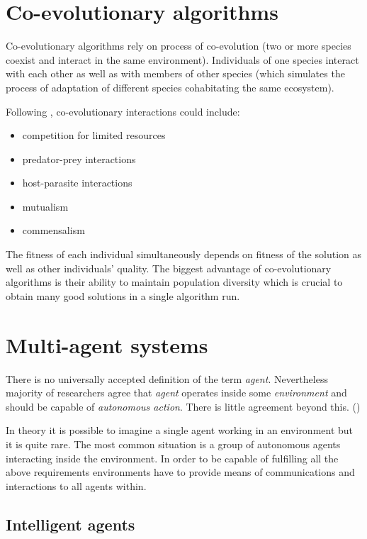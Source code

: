 \begin{}
\section{Co-evolutionary algorithms}
\label{sec:co-evol}

Co-evolutionary algorithms rely on process of co-evolution (two or more species coexist and interact in the same environment).
Individuals of one species interact with each other as well as with members of other species (which simulates the process of adaptation of different species cohabitating the same 
ecosystem).
  
Following \cite{Dre}, co-evolutionary interactions could include:

\begin{itemize}
  \item competition for limited resources
  \item predator-prey interactions
  \item host-parasite interactions
  \item mutualism
  \item commensalism
\end{itemize}

The fitness of each individual simultaneously depends on fitness of the solution as well as other individuals' quality.
The biggest advantage of co-evolutionary algorithms is their ability to maintain population diversity which is crucial to obtain many good solutions in a single algorithm run.    

  


\section{Multi-agent systems}
\label{sec:multi}

There is no universally accepted definition of the term \emph{agent}.
Nevertheless majority of researchers agree that \emph{agent} operates inside some \emph{environment} and should be capable of \emph{autonomous action}.
There is little agreement beyond this. (\cite{Weiss}) 
 
In theory it is possible to imagine a single agent working in an environment but it is quite rare.
The most common situation is a group of autonomous agents interacting inside the environment.
In order to be capable of fulfilling all the above requirements environments have to provide means of communications and interactions to all agents within.

\subsection{Intelligent agents}


\end{}
